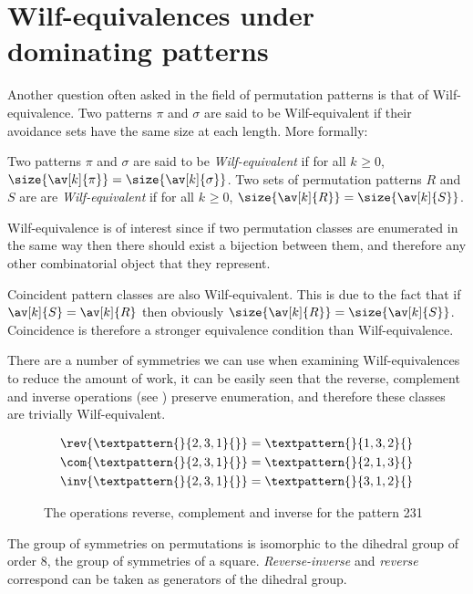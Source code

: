 \chapter[Wilf-Classification]{Wilf-equivalences under dominating  patterns}

Another question often asked in the field of permutation patterns is that
of Wilf-equivalence. Two patterns \(\pi\) and \(\sigma\) are said to be
Wilf-equivalent if their avoidance sets have the same size at each
length. More formally:

\begin{definition}
    Two patterns \(\pi\) and \(\sigma\) are said to be \emph{Wilf-equivalent}
    if for all \(k_{} \ge 0\), \(\size{\av[k]{\pi}} = \size{\av[k]{\sigma}}\).
    Two sets of permutation patterns \(R\) and \(S\) are are
    \emph{Wilf-equivalent} if for all \(k_{} \ge 0\),
    \(\size{\av[k]{R}} = \size{\av[k]{S}}\).
\end{definition}

Wilf-equivalence is of interest since if two permutation classes are enumerated
in the same way then there should exist a bijection between them, and therefore
any other combinatorial object that they represent.

Coincident pattern classes are also Wilf-equivalent. This is due to the fact that
if \(\av[k]{S} = \av[k]{R}\) then obviously \(\size{\av[k]{R}} = \size{\av[k]{S}}\).
Coincidence is therefore a stronger equivalence condition than Wilf-equivalence.

There are a number of symmetries we can use when examining Wilf-equivalences
to reduce the amount of work, it can be easily seen that the reverse, complement
and inverse operations (see ) preserve enumeration, and therefore these classes are trivially
Wilf-equivalent.
\begin{figure}[!htb]
\begin{align*}
    \rev{\textpattern{}{2,3,1}{}} &= \textpattern{}{1,3,2}{}\\
    \com{\textpattern{}{2,3,1}{}} &= \textpattern{}{2,1,3}{}\\
    \inv{\textpattern{}{2,3,1}{}} &= \textpattern{}{3,1,2}{}
\end{align*}
\caption{The operations reverse, complement and inverse for the pattern 231}
\label{fig:symm}
\end{figure}

The group of symmetries on permutations is isomorphic to the dihedral group
of order \(8\), the group of symmetries of a square. \emph{Reverse-inverse} and
\emph{reverse} correspond can be taken as generators of the dihedral group.

